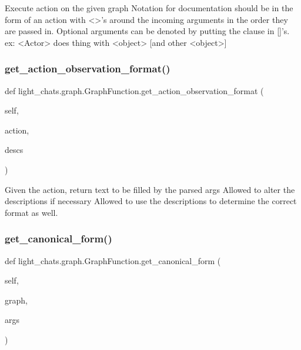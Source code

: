\begin{DoxyVerb}Execute action on the given graph
Notation for documentation should be in the form of an action with <>'s
around the incoming arguments in the order they are passed in. Optional
arguments can be denoted by putting the clause in []'s.
ex:
<Actor> does thing with <object> [and other <object>]
\end{DoxyVerb}
 \mbox{\label{classlight__chats_1_1graph_1_1GraphFunction_a8828c59ad0d9f53bfb2234f0b8b37377}} 
\subsubsection{\texorpdfstring{get\+\_\+action\+\_\+observation\+\_\+format()}{get\_action\_observation\_format()}}
{\footnotesize\ttfamily def light\+\_\+chats.\+graph.\+Graph\+Function.\+get\+\_\+action\+\_\+observation\+\_\+format (\begin{DoxyParamCaption}\item[{}]{self,  }\item[{}]{action,  }\item[{}]{descs }\end{DoxyParamCaption})}

\begin{DoxyVerb}Given the action, return text to be filled by the parsed args Allowed to alter
the descriptions if necessary Allowed to use the descriptions to determine the
correct format as well.
\end{DoxyVerb}
 \mbox{\label{classlight__chats_1_1graph_1_1GraphFunction_a0994341bec72be122101ce59da936882}} 
\subsubsection{\texorpdfstring{get\+\_\+canonical\+\_\+form()}{get\_canonical\_form()}}
{\footnotesize\ttfamily def light\+\_\+chats.\+graph.\+Graph\+Function.\+get\+\_\+canonical\+\_\+form (\begin{DoxyParamCaption}\item[{}]{self,  }\item[{}]{graph,  }\item[{}]{args }\end{DoxyParamCaption})}

